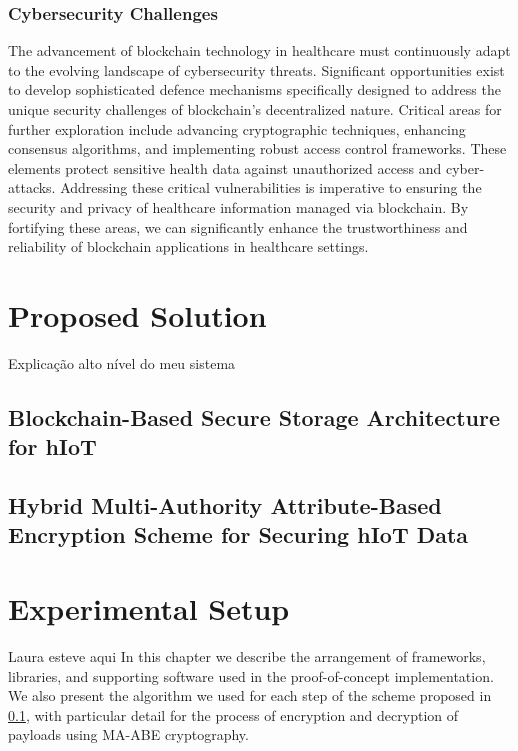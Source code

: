 \documentclass[cic,tc,english]{iiufrgs}
\begin{document}
        \subsection{Cybersecurity Challenges} 
            The advancement of blockchain technology in healthcare must continuously adapt to the evolving landscape of cybersecurity threats. Significant opportunities exist to develop sophisticated defence mechanisms specifically designed to address the unique security challenges of blockchain's decentralized nature. Critical areas for further exploration include advancing cryptographic techniques, enhancing consensus algorithms, and implementing robust access control frameworks. These elements protect sensitive health data against unauthorized access and cyber-attacks. Addressing these critical vulnerabilities is imperative to ensuring the security and privacy of healthcare information managed via blockchain. By fortifying these areas, we can significantly enhance the trustworthiness and reliability of blockchain applications in healthcare settings.

\chapter{Proposed Solution}
    \label{chap:proposedsolution}
    Explicação alto nível do meu sistema

    \section{Blockchain-Based Secure Storage Architecture for hIoT}
        \label{sec:architecture}

    \section{Hybrid Multi-Authority Attribute-Based Encryption Scheme for Securing hIoT Data}
        \label{sec:encryption}

\chapter{Experimental Setup}
    \label{chap:experimentalsetup}

\begin{draft}{Laura esteve aqui}
    In this chapter we describe the arrangement of frameworks, libraries, and supporting software used in the proof-of-concept implementation. We also present the algorithm we used for each step of the scheme proposed in \ref{}, with particular detail for the process of encryption and decryption of payloads using  MA-ABE cryptography.
\end{draft}
\end{document}
